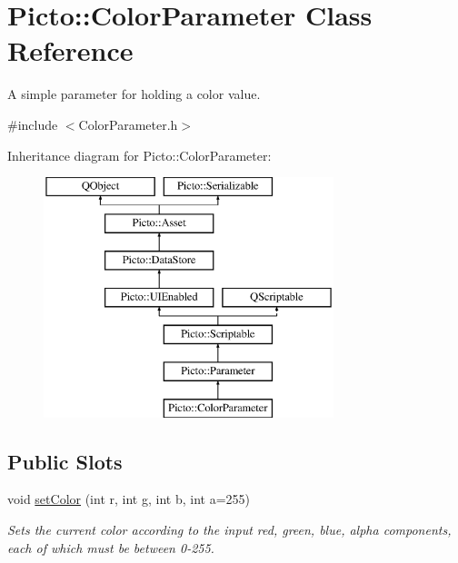 \hypertarget{class_picto_1_1_color_parameter}{\section{Picto\-:\-:Color\-Parameter Class Reference}
\label{class_picto_1_1_color_parameter}
}


A simple parameter for holding a color value.  




{\ttfamily \#include $<$Color\-Parameter.\-h$>$}

Inheritance diagram for Picto\-:\-:Color\-Parameter\-:\begin{figure}[H]
\begin{center}
\leavevmode
\includegraphics[height=7.000000cm]{class_picto_1_1_color_parameter}
\end{center}
\end{figure}
\subsection*{Public Slots}
\begin{DoxyCompactItemize}
\item 
\hypertarget{class_picto_1_1_color_parameter_a88fd07a0caaf9f9f4c2b67038d6b4735}{void \hyperlink{class_picto_1_1_color_parameter_a88fd07a0caaf9f9f4c2b67038d6b4735}{set\-Color} (int r, int g, int b, int a=255)}\label{class_picto_1_1_color_parameter_a88fd07a0caaf9f9f4c2b67038d6b4735}

\begin{DoxyCompactList}\small\item\em Sets the current color according to the input red, green, blue, alpha components, each of which must be between 0-\/255. \end{DoxyCompactList}\end{DoxyCompactItemize}

